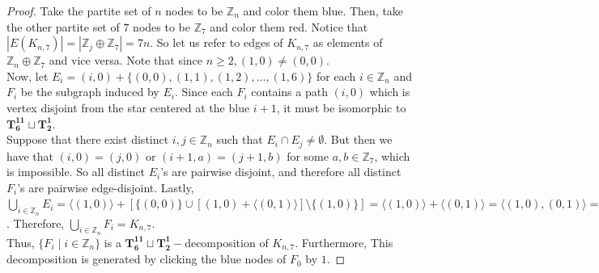 \documentclass{dmgt}
\newcommand{\ZZ}{\ensuremath{\mathbb{Z}}} %
\begin{document}
\begin{proof}
    Take the partite set of $n$ nodes to be $\ZZ_{n}$ and color them blue. Then, take the other partite set of $7$ nodes to be $\ZZ_{7}$ and color them red. Notice that $|E(K_{n,7})|=|\ZZ_{j}\oplus \ZZ_{7}|=7n$. So let us refer to edges of $K_{n,7}$ as elements of $\ZZ_{n}\oplus \ZZ_{7}$ and vice versa. Note that since $n\geq 2, (1,0)\neq (0,0)$.
    \\
    
    \noindent Now, let $E_{i}= (i,0)+\{(0,0),(1,1),(1,2),\hdots,(1,6)\}$ for each $i\in \ZZ_{n}$ and $F_{i}$ be the subgraph induced by $E_{i}$. Since each $F_{i}$ contains a path $(i,0)$ which is vertex disjoint from the star centered at the blue $i+1$, it must be isomorphic to $\mathbf{T_{6}^{11}}\sqcup\mathbf{T_{2}^{1}}$.
    \\

    
    \noindent Suppose that there exist distinct $i,j\in \ZZ_{n}$ such that $E_{i}\cap E_{j}\neq \emptyset$. But then we have that $(i,0)=(j,0)$ or $(i+1,a)=(j+1,b)$ for some $a,b\in \ZZ_{7}$, which is impossible. So all distinct $E_{i}$'s are pairwise disjoint, and therefore all distinct $F_{i}$'s are pairwise edge-disjoint. Lastly, $\bigcup_{i\in \ZZ_{n}} E_{i}=\langle (1,0)\rangle + [\{(0,0)\}\cup [(1,0)+\langle (0,1)\rangle] \setminus \{(1,0)\}]=\langle (1,0)\rangle + \langle (0,1)\rangle = \langle (1,0),(0,1)\rangle = \ZZ_{n}\oplus \ZZ_{7}$. Therefore, $\bigcup_{i\in \ZZ_{n}} F_{i} = K_{n,7}$. 
    \\
    
    \noindent Thus, $\{F_{i}\mid i\in \ZZ_{n}\}$ is a $\mathbf{T_{6}^{11}}\sqcup\mathbf{T_{2}^{1}}-$decomposition of $K_{n,7}$. Furthermore, This decomposition is generated by clicking the blue nodes of $F_{0}$ by $1$.
    
\end{proof}
\end{document}
